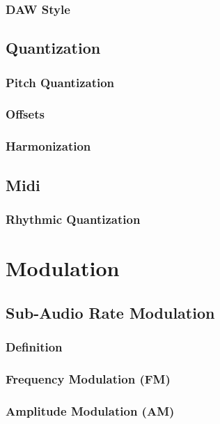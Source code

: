 \documentclass[11pt]{article}
\begin{document}
\subsubsection{DAW Style}
\label{sec:orge56dfa5}
\subsection{Quantization}
\label{sec:org23b4a4f}
\subsubsection{Pitch Quantization}
\label{sec:org8eea0ee}
\subsubsection{Offsets}
\label{sec:orgfcaf516}
\subsubsection{Harmonization}
\label{sec:org92bd481}
\subsection{Midi}
\label{sec:org9bce984}
\subsubsection{Rhythmic Quantization}
\label{sec:orge8d2669}

\section{Modulation}
\label{sec:org6ae6aba}
\subsection{Sub-Audio Rate Modulation}
\label{sec:orgb6bf45a}
\subsubsection{Definition}
\label{sec:org78f8e2b}
\subsubsection{Frequency Modulation (FM)}
\label{sec:org5a09503}
\subsubsection{Amplitude Modulation (AM)}
\label{sec:org6d1f409}
\end{document}
